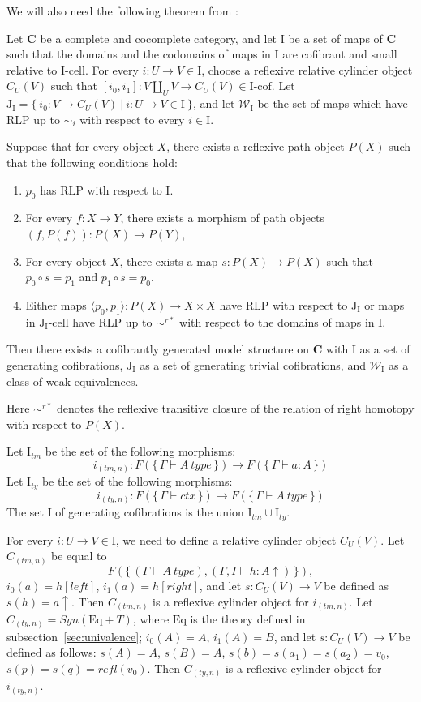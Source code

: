 \documentclass[reqno]{amsart}
\theoremstyle{definition}
\theoremstyle{remark}
\newcommand{\Eq}{\mathrm{Eq}}
\newcommand{\cat}[1]{\mathbf{#1}}
\newcommand{\C}{\cat{C}}
\newcommand{\type}{type}
\newcommand{\we}{\mathcal{W}}
\newcommand{\I}{\mathrm{I}}
\newcommand{\J}{\mathrm{J}}
\newcommand{\class}[2]{#1\text{-}\mathrm{#2}}
\newcommand{\Icell}[1][\I]{\class{#1}{cell}}
\newcommand{\Icof}[1][\I]{\class{#1}{cof}}
\newcommand{\Jcell}[1][]{\Icell[\J#1]}
\newcommand{\cyli}{i}
\numberwithin{figure}{section}
\begin{document}
We will also need the following theorem from \cite{f-model-structures}:
\begin{thm}
Let $\C$ be a complete and cocomplete category, and let $\I$ be a set of maps of $\C$
such that the domains and the codomains of maps in $\I$ are cofibrant and small relative to $\Icell$.
For every $i : U \to V \in \I$, choose a reflexive relative cylinder object $C_U(V)$
such that $[\cyli_0,\cyli_1] : V \amalg_U V \to C_U(V) \in \Icof$.
Let $\J_\I = \{\ \cyli_0 : V \to C_U(V)\ |\ i : U \to V \in \I \ \}$, and
let $\we_\I$ be the set of maps which have RLP up to $\sim_i$ with respect to every $i \in \I$.

Suppose that for every object $X$, there exists a reflexive path object $P(X)$ such that the following conditions hold:
\begin{enumerate}
\item $p_0$ has RLP with respect to $\I$.
\item For every $f : X \to Y$, there exists a morphism of path objects $(f,P(f)) : P(X) \to P(Y)$,
\item For every object $X$, there exists a map $s : P(X) \to P(X)$ such that $p_0 \circ s = p_1$ and $p_1 \circ s = p_0$.
\item Either maps $\langle p_0, p_1 \rangle : P(X) \to X \times X$ have RLP with respect to $\J_\I$
or maps in $\Jcell[_\I]$ have RLP up to $\sim^{r*}$ with respect to the domains of maps in $\I$.
\end{enumerate}
Then there exists a cofibrantly generated model structure on $\C$ with $\I$ as a set of generating cofibrations,
$\J_\I$ as a set of generating trivial cofibrations, and $\we_\I$ as a class of weak equivalences.
\end{thm}
Here $\sim^{r*}$ denotes the reflexive transitive closure of the relation of right homotopy with respect to $P(X)$.

Let $\I_{tm}$ be the set of the following morphisms:
\[ i_{(tm,n)} : F(\{\,\Gamma \vdash A\ \type\,\}) \to F(\{\,\Gamma \vdash a : A\,\}) \]
Let $\I_{ty}$ be the set of the following morphisms:
\[ i_{(ty,n)} : F(\{\,\Gamma \vdash ctx\,\}) \to F(\{\,\Gamma \vdash A\ \type\,\}) \]
The set $\I$ of generating cofibrations is the union $\I_{tm} \cup \I_{ty}$.

For every $i : U \to V \in \I$, we need to define a relative cylinder object $C_U(V)$.
Let $C_{(tm,n)}$ be equal to
\[ F(\{\,(\Gamma \vdash A\ \type), (\Gamma, I \vdash h : A\!\uparrow)\,\}), \]
$\cyli_0(a) = h[left]$, $\cyli_1(a) = h[right]$, and let $s : C_U(V) \to V$ be defined as $s(h) = a\!\uparrow$.
Then $C_{(tm,n)}$ is a reflexive cylinder object for $i_{(tm,n)}$.
Let $C_{(ty,n)} = Syn(\Eq + T)$, where $\Eq$ is the theory defined in subsection~\ref{sec:univalence};
$\cyli_0(A) = A$, $\cyli_1(A) = B$, and let $s : C_U(V) \to V$ be defined as follows:
$s(A) = A$, $s(B) = A$, $s(b) = s(a_1) = s(a_2) = v_0$, $s(p) = s(q) = refl(v_0)$.
Then $C_{(ty,n)}$ is a reflexive cylinder object for $i_{(ty,n)}$.
\end{document}
